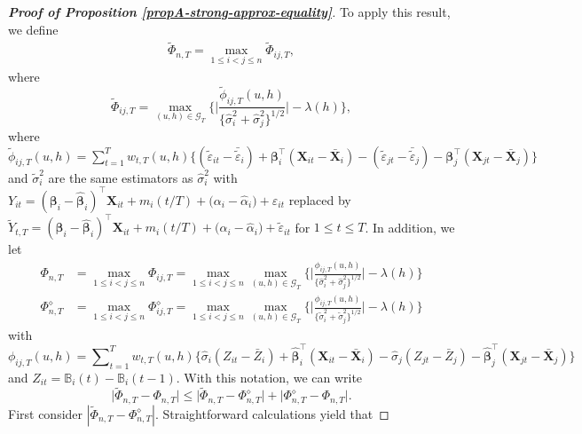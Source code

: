 \begin{proof}[\textnormal{\textbf{Proof of Proposition \ref{propA-strong-approx-equality}}}]
To apply this result, we define 
\begin{align}\label{Phi-tilde-statistic}
\widetilde{\Phi}_{n,T} = \max_{1 \le i < j \le n} \widetilde{\Phi}_{ij,T},
\end{align}
where
\[ \widetilde{\Phi}_{ij, T} = \max_{(u,h) \in \mathcal{G}_T} \Big\{ \Big|\frac{\widetilde{\phi}_{ij, T}(u,h)}{\{\widehat{\sigma}_i^2 + \widehat{\sigma}_j^2 \}^{1/2}} \Big| - \lambda(h) \Big\}, \]
where $\widetilde{\phi}_{ij, T}(u,h) = \sum\nolimits_{t=1}^T w_{t,T}(u,h) \big\{ (\widetilde{\varepsilon}_{it} - \bar{\widetilde{\varepsilon}}_i) + \bm{\beta}_i^\top (\mathbf{X}_{it} - \bar{\mathbf{X}}_{i}) - (\widetilde{\varepsilon}_{jt} - \bar{\widetilde{\varepsilon}}_j) -\bm{\beta}_j^\top (\mathbf{X}_{jt} - \bar{\mathbf{X}}_{j}) \big\}$ and $\widetilde{\sigma}^2_i$ are the same estimators as $\widehat{\sigma}^2_i$ with $Y_{it} = 
(\bm{\beta}_i - \widehat{\bm{\beta}}_i)^\top \mathbf{X}_{it} + m_i ( t/T) + \big( \alpha_i - \widehat{\alpha}_i \big) + \varepsilon_{it}$
replaced by $\widetilde{Y}_{t,T} = 
(\bm{\beta}_i - \widehat{\bm{\beta}}_i)^\top \mathbf{X}_{it} + m_i(t/T) + \big( \alpha_i - \widehat{\alpha}_i \big) + \widetilde{\varepsilon}_{it}$  for $1 \le t \le T$. In addition, we let
\begin{align*}
\Phi_{n, T} & = \max_{1\leq i < j \leq n} \Phi_{ij, T}= \max_{1\leq i < j \leq n} \max_{(u,h) \in \mathcal{G}_T} \Big\{ \Big|\frac{\phi_{ij, T}(u,h)}{\{\widehat{\sigma}_i^2 + \widehat{\sigma}_j^2 \}^{1/2}}\Big| - \lambda(h) \Big\} \\
\Phi_{n, T}^{\diamond} & =\max_{1\leq i < j \leq n} \Phi_{ij, T}^{\diamond} = \max_{1\leq i< j \leq n}\max_{(u,h) \in \mathcal{G}_T} \Big\{ \Big|\frac{\phi_{ij, T}(u,h)}{\{\widetilde{\sigma}_i^2 + \widetilde{\sigma}_j^2 \}^{1/2}}\Big| - \lambda(h) \Big\} 
\end{align*}
with $$\phi_{ij, T}(u,h) = \sum\nolimits_{t=1}^T w_{t,T}(u,h) \big\{ \widehat{\sigma}_i (Z_{it} - \bar{Z}_i) + \widehat{\bm{\beta}}_i^\top (\mathbf{X}_{it} - \bar{\mathbf{X}}_{i}) - \widehat{\sigma}_j (Z_{jt} - \bar{Z}_j) - \widehat{\bm{\beta}}_j^\top (\mathbf{X}_{jt} - \bar{\mathbf{X}}_{j}) \big\}$$ and $Z_{it} = \mathbb{B}_i(t) - \mathbb{B}_i(t-1)$. With this notation, we can write 
\begin{equation}\label{eq-strongapprox-bound1}
\big| \widetilde{\Phi}_{n, T} - \Phi_{n, T} \big| \le \big| \widetilde{\Phi}_{n, T} - \Phi_{n, T}^{\diamond} \big| + \big| \Phi_{n, T}^{\diamond} - \Phi_{n, T} \big|. 
\end{equation}
First consider $|\widetilde{\Phi}_{n, T} - \Phi_{n, T}^{\diamond}|$. Straightforward calculations yield that 

\end{proof}
